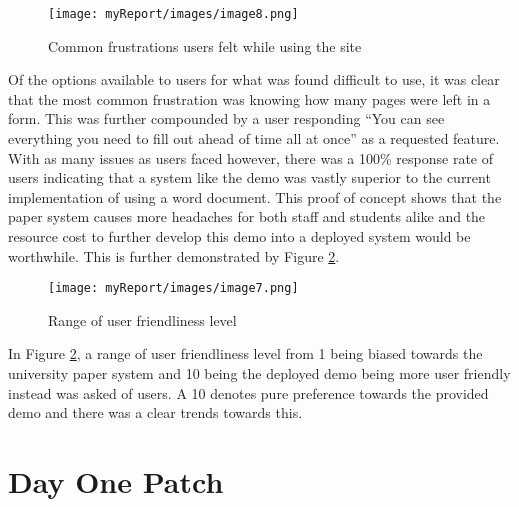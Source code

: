 \begin{figure}[H]
\centering
\texttt{[image: myReport/images/image8.png]}
\caption{Common frustrations users felt while using the site}
\label{fig:user_furstrations}
\end{figure}

Of the options available to users for what was found difficult to use, it was clear that the most common frustration was knowing how many pages were left in a form. This was further compounded by a user responding “You can see everything you need to fill out ahead of time all at once” as a requested feature. 
\newline
\newline
With as many issues as users faced however, there was a 100\% response rate of users indicating that a system like the demo was vastly superior to the current implementation of using a word document. This proof of concept shows that the paper system causes more headaches for both staff and students alike and the resource cost to further develop this demo into a deployed system would be worthwhile. This is further demonstrated by Figure \ref{fig:friendliness}.

\begin{figure}[H]
\centering
\texttt{[image: myReport/images/image7.png]}
\caption{Range of user friendliness level}
\label{fig:friendliness}
\end{figure}

In Figure \ref{fig:friendliness}, a range of user friendliness level from 1 being biased towards the university paper system and 10 being the deployed demo being more user friendly instead was asked of users. A 10 denotes pure preference towards the provided demo and there was a clear trends towards this.

\section{Day One Patch}

